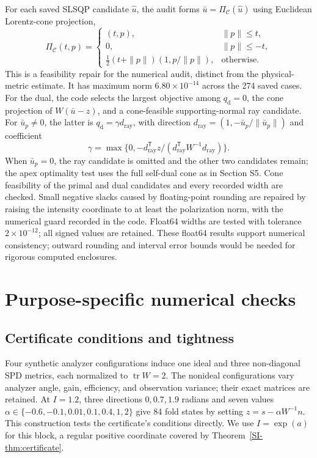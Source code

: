 For each saved SLSQP candidate $\widehat u$, the audit forms $\bar u=\Pi_{\mathcal C}(\widehat u)$ using Euclidean Lorentz-cone projection,
\begin{equation}
 \Pi_{\mathcal C}(t,p)=
 \begin{cases}
 (t,p),&\|p\|\leq t,\\
 0,&\|p\|\leq-t,\\
 \tfrac12(t+\|p\|)(1,p/\|p\|),&\text{otherwise}.
 \end{cases}
 \label{SI-eq:euclideancone}
\end{equation}
This is a feasibility repair for the numerical audit, distinct from the physical-metric estimate. It has maximum norm $6.80\times10^{-14}$ across the 274 saved cases. For the dual, the code selects the largest objective among $q_{\mathrm d}=0$, the cone projection of $W(\bar u-z)$, and a cone-feasible supporting-normal ray candidate. For $\bar u_p\ne0$, the latter is $q_{\mathrm d}=\gamma d_{\mathrm{ray}}$, with direction $d_{\mathrm{ray}}=(1,-\bar u_p/\|\bar u_p\|)$ and coefficient
\begin{equation}
 \gamma=\max\{0,-d_{\mathrm{ray}}^{\mathsf T}z/(d_{\mathrm{ray}}^{\mathsf T}W^{-1}d_{\mathrm{ray}})\}.
 \label{SI-eq:dualcandidate}
\end{equation}
When $\bar u_p=0$, the ray candidate is omitted and the other two candidates remain; the apex optimality test uses the full self-dual cone as in Section S5. Cone feasibility of the primal and dual candidates and every recorded width are checked. Small negative slacks caused by floating-point rounding are repaired by raising the intensity coordinate to at least the polarization norm, with the numerical guard recorded in the code. Float64 widths are tested with tolerance $2\times10^{-12}$; all signed values are retained. These float64 results support numerical consistency; outward rounding and interval error bounds would be needed for rigorous computed enclosures.

\section{Purpose-specific numerical checks}
\subsection{Certificate conditions and tightness}
Four synthetic analyzer configurations induce one ideal and three non-diagonal SPD metrics, each normalized to $\operatorname{tr}W=2$. The nonideal configurations vary analyzer angle, gain, efficiency, and observation variance; their exact matrices are retained. At $I=1.2$, three directions $0,0.7,1.9$ radians and seven values $\alpha\in\{-0.6,-0.1,0.01,0.1,0.4,1,2\}$ give 84 fold states by setting $z=s-\alpha W^{-1}n$. This construction tests the certificate's conditions directly. We use $I=\exp(a)$ for this block, a regular positive coordinate covered by Theorem~\ref{SI-thm:certificate}.


